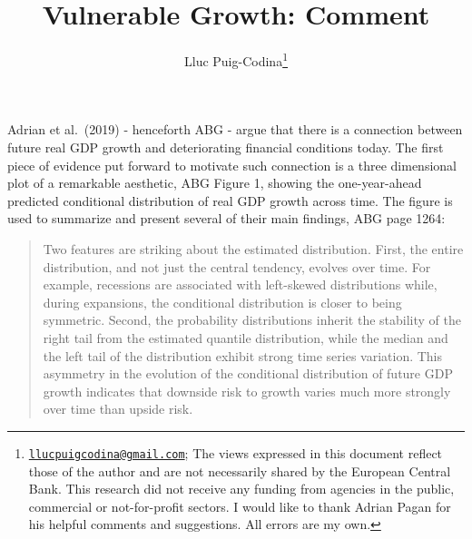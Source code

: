 \documentclass[
  11pt,
]{article}
\title{Vulnerable Growth: Comment}
\author{Lluc Puig-Codina\footnote{\href{mailto:llucpuigcodina@gmail.com}{\nolinkurl{llucpuigcodina@gmail.com}};
  The views expressed in this document reflect those of the author and
  are not necessarily shared by the European Central Bank. This research
  did not receive any funding from agencies in the public, commercial or
  not-for-profit sectors. I would like to thank Adrian Pagan for his
  helpful comments and suggestions. All errors are my own.}}
\date{}
\begin{document}
\maketitle

\newpage


\vspace{0.5cm}

Adrian et al.~(2019) - henceforth ABG - argue that there is a connection
between future real GDP growth and deteriorating financial conditions
today. The first piece of evidence put forward to motivate such
connection is a three dimensional plot of a remarkable aesthetic, ABG
Figure 1, showing the one-year-ahead predicted conditional distribution
of real GDP growth across time. The figure is used to summarize and
present several of their main findings, ABG page 1264:

\begin{quote}
Two features are striking about the estimated distribution. First, the
entire distribution, and not just the central tendency, evolves over
time. For example, recessions are associated with left-skewed
distributions while, during expansions, the conditional distribution is
closer to being symmetric. Second, the probability distributions inherit
the stability of the right tail from the estimated quantile
distribution, while the median and the left tail of the distribution
exhibit strong time series variation. This asymmetry in the evolution of
the conditional distribution of future GDP growth indicates that
downside risk to growth varies much more strongly over time than upside
risk.
\end{quote}
\end{document}

